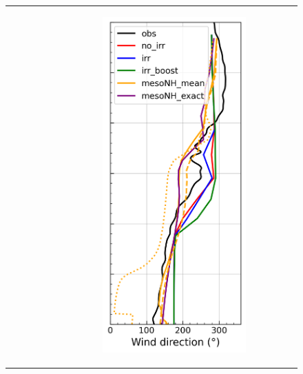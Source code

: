 \begin{figure}[hbtp]
{\begin{tabular}{@{}cccc@{}}
\begin{subfigure}[t]{0.283\textwidth}
        \end{subfigure} &
        \begin{subfigure}[t]{0.283\textwidth}
            \caption{}
            \includegraphics[width=\textwidth]{images/chap5/profiles/profile_elsplans_wind_direction_2007_sensbins.png}

\end{subfigure}
\end{tabular}}
\end{figure}
